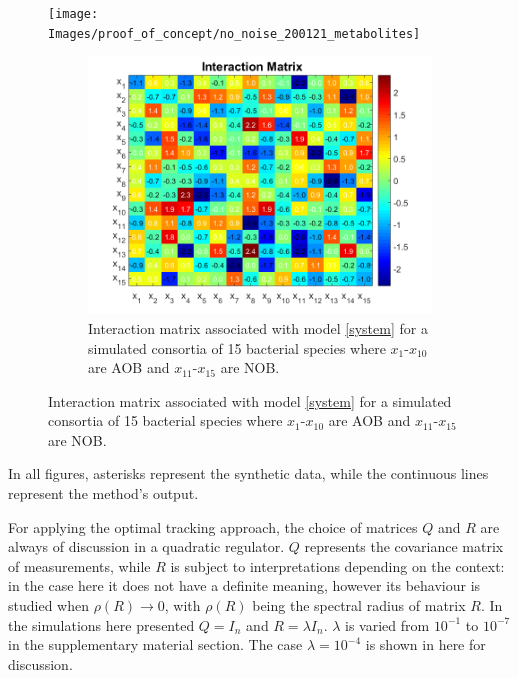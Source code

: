 \documentclass[3p,times]{elsarticle}
\begin{document}
\begin{figure}[h]
	\centering
	\texttt{[image: Images/proof\_of\_concept/no\_noise\_200121\_metabolites]}
	\caption{}
	\label{fig:nonoise200121metabolites}
\end{figure}

\begin{figure}[h]
	\centering	
	\begin{subfigure}{0.45 \linewidth}
		\includegraphics[width=\linewidth]{Synthetic_data_no_noise//Interactions_synthetic_data_no_noise}
		\caption{Interaction matrix associated with model \eqref{system} for a simulated consortia of 15 bacterial species where $x_1$-$x_{10}$ are AOB and $x_{11}$-$x_{15}$ are NOB.}
		\label{Interaction Matrix Simulation}
	\end{subfigure}
\end{figure}


In all figures, asterisks represent the synthetic data, while the continuous lines represent the method's output.

For applying the optimal tracking approach, the choice of matrices $Q$ and $R$ are always of discussion in a quadratic regulator. $Q$ represents the covariance matrix of measurements, while $R$ is subject to interpretations depending on the context: in the case here it does not have a definite meaning, however its behaviour is studied when $\rho(R) \rightarrow 0$, with $\rho(R)$ being the spectral radius of matrix $R$. In the simulations here presented $Q = I_n$ and $R = \lambda I_n$. $\lambda$ is varied from $10^{-1}$ to $10^{-7}$ in the supplementary material section. The case $\lambda = 10^{-4}$ is shown in here for discussion. 
\end{document}
